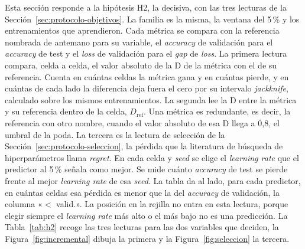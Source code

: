 Esta sección responde a la hipótesis H2, la decisiva, con las tres lecturas de la Sección~\ref{sec:protocolo-objetivos}. La familia es la misma, la ventana del 5\,\% y los entrenamientos que aprendieron. Cada métrica se compara con la referencia nombrada de antemano para su variable, el \emph{accuracy} de validación para el \emph{accuracy} de test y el \emph{loss} de validación para el \emph{gap} de \emph{loss}. La primera lectura compara, celda a celda, el valor absoluto de la D de la métrica con el de su referencia. Cuenta en cuántas celdas la métrica gana y en cuántas pierde, y en cuántas de cada lado la diferencia deja fuera el cero por su intervalo \emph{jackknife}, calculado sobre los mismos entrenamientos. La segunda lee la D entre la métrica y su referencia dentro de la celda, $D_{\mathrm{ref}}$. Una métrica es redundante, es decir, la referencia con otro nombre, cuando el valor absoluto de esa D llega a 0,8, el umbral de la poda. La tercera es la lectura de selección de la Sección~\ref{sec:protocolo-seleccion}, la pérdida que la literatura de búsqueda de hiperparámetros llama \emph{regret}. En cada celda y \emph{seed} se elige el \emph{learning rate} que el predictor al 5\,\% señala como mejor. Se mide cuánto \emph{accuracy} de test se pierde frente al mejor \emph{learning rate} de esa \emph{seed}. La tabla da al lado, para cada predictor, en cuántas celdas esa pérdida es menor que la del \emph{accuracy} de validación, la columna «$<$ valid.». La posición en la rejilla no entra en esta lectura, porque elegir siempre el \emph{learning rate} más alto o el más bajo no es una predicción. La Tabla~\ref{tab:h2} recoge las tres lecturas para las dos variables que deciden, la Figura~\ref{fig:incremental} dibuja la primera y la Figura~\ref{fig:seleccion} la tercera.

